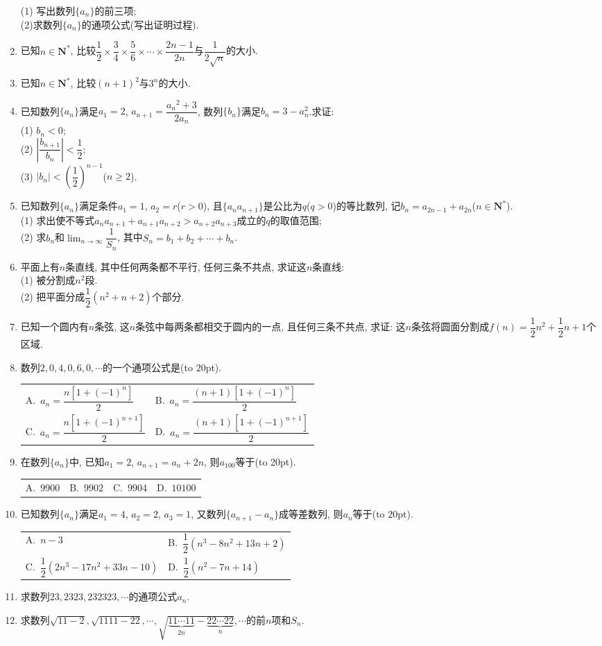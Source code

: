 \documentclass[10pt,a4paper]{article}
\newcommand{\bracket}[1]{(\hbox to #1pt{})}
\newcommand{\twoch}[4]{\par\begin{tabular}{p{.46\textwidth}p{.46\textwidth}}
A.~#1& B.~#2\\
C.~#3& D.~#4
\end{tabular}}
\newcommand{\fourch}[4]{\par\begin{tabular}{p{.23\textwidth}p{.23\textwidth}p{.23\textwidth}p{.23\textwidth}}
A.~#1 &B.~#2& C.~#3& D.~#4
\end{tabular}}
\begin{document}
\begin{enumerate}[1.]
(1) 写出数列$\{a_n\}$的前三项;\\
(2)求数列$\{a_n\}$的通项公式(写出证明过程).
\item 已知$n\in \mathbf{N}^*$, 比较$\dfrac 12\times \dfrac 34\times \dfrac 56\times \cdots \times \dfrac{2n-1}{2n}$与$\dfrac 1{2\sqrt n}$的大小.
\item 已知$n\in \mathbf{N}^*$, 比较$(n+1)^2$与$3^n$的大小.
\item 已知数列$\{a_n\}$满足$a_1=2$, $a_{n+1}=\dfrac{{a_n}^2+3}{2{a_n}}$, 数列$\{b_n\}$满足$b_n=3-a_n^2$.求证:\\
(1) $b_n<0$;\\
(2) $|\dfrac{{b_{n+1}}}{b_n}|<\dfrac 12$;\\
(3) $|b_n|<(\dfrac 12)^{n-1}$($n\ge 2$).
\item 已知数列$\{a_n\}$满足条件$a_1=1$, $a_2=r$($r>0$), 且$\{a_na_{n+1}\}$是公比为$q$($q>0$)的等比数列, 记$b_n=a_{2n-1}+a_{2n}$($n\in \mathbf{N}^*$).\\
(1) 求出使不等式$a_na_{n+1}+a_{n+1}a_{n+2}>a_{n+2}a_{n+3}$成立的$q$的取值范围;\\
(2) 求$b_n$和$\displaystyle \lim_{n\to \infty} \dfrac 1{S_n}$, 其中$S_n=b_1+b_2+\cdots +b_n$.
\item 平面上有$n$条直线, 其中任何两条都不平行, 任何三条不共点, 求证这$n$条直线:\\
(1) 被分割成$n^2$段.\\
(2) 把平面分成$\dfrac 12(n^2+n+2)$个部分.
\item 已知一个圆内有$n$条弦, 这$n$条弦中每两条都相交于圆内的一点, 且任何三条不共点, 求证: 这$n$条弦将圆面分割成$f(n)=\dfrac 12n^2+\dfrac 12n+1$个区域.
\item 数列$2, 0, 4, 0, 6, 0, \cdots$的一个通项公式是\bracket{20}.
\twoch{$a_n=\dfrac{n[1+(-1)^n]}2$}{$a_n=\dfrac{(n+1)[1+(-1)^n]}2$}{$a_n=\dfrac{n[1+(-1)^{n+1}]}2$}{$a_n=\dfrac{(n+1)[1+(-1)^{n+1}]}2$}
\item 在数列$\{a_n\}$中, 已知$a_1=2$, $a_{n+1}=a_n+2n$, 则$a_{100}$等于\bracket{20}.
\fourch{$9900$}{$9902$}{$9904$}{$10100$}
\item 已知数列$\{a_n\}$满足$a_1=4$, $a_2=2$, $a_3=1$, 又数列$\{a_{n+1}-a_n\}$成等差数列, 则$a_n$等于\bracket{20}.
\twoch{$n-3$}{$\dfrac 12(n^3-8n^2+13n+2)$}{$\dfrac 12(2n^3-17n^2+33n-10)$}{$\dfrac 12(n^2-7n+14)$}
\item 求数列$23, 2323, 232323, \cdots$的通项公式$a_n$.
\item 求数列$\sqrt {11-2},\sqrt {1111-22},\cdots,\sqrt {\underbrace{11\cdots 11}_{2n}-\underbrace{22\cdots 22}_{n}}, \cdots$的前$n$项和$S_n$.

\end{enumerate}
\end{document}
